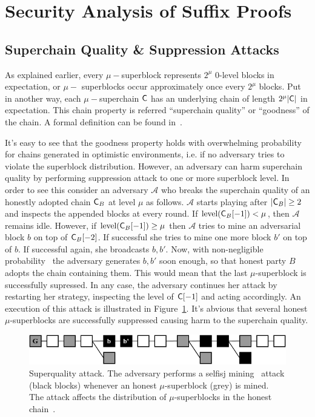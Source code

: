 \section{Security Analysis of Suffix Proofs}

\subsection{Superchain Quality \& Suppression Attacks}

As explained earlier, every $\mu-$superblock represents $2^\mu$ 0-level blocks in expectation, or $\mu-$ superblocks occur approximately once every $2^\mu$ blocks. Put in another way, each $\mu-$superchain $\mathsf{C}$ has an underlying chain of length $2^\mu \lvert \mathsf{C} \rvert$ in expectation. This chain property is referred ``superchain quality'' or ``goodness'' of the chain. A formal definition can be found in~\cite{nipopows}.

It's easy to see that the goodness property holds with overwhelming probability for chains generated in optimistic environments, i.e. if no adversary tries to violate the superblock distribution. However, an adversary can harm superchain quality by performing suppression attack to one or more superblock level. In order to see this consider an adversary $\mathcal{A}$ who breaks the superchain quality of an honestly adopted chain $\mathsf{C}_B$ at level $\mu$ as follows. $\mathcal{A}$ starts playing after $\lvert \mathsf{C}_B \rvert \geq 2$ and inspects the appended blocks at every round. If $\text{level}(\mathsf{C}_B[-1]) < \mu$, then $\mathcal{A}$ remains idle. However, if $\text{level}(\mathsf{C}_B[-1]) \geq \mu$ then $\mathcal{A}$ tries to mine an adversarial block $b$ on top of $\mathsf{C}_B[-2]$. If successful she tries to mine one more block $b'$ on top of $b$. If successful again, she broadcasts $b, b'$. Now, with non-negligible probability~\cite{nipopows} the adversary generates $b, b'$ soon enough, so that honest party $B$ adopts the chain containing them. This would mean that the last $\mu$-superblock is successfully supressed. In any case, the adversary continues her attack by restarting her strategy, inspecting the level of $\mathsf{C}[-1]$ and acting accordingly. An execution of this attack is illustrated in Figure~\ref{fig:superquality_attack}. It's abvious that several honest $\mu$-superblocks are successfully suppressed causing harm to the superchain quality. 

\begin{figure}[h!]
	\begin{center}
		\includegraphics[width=0.7\columnwidth]{figures/superquality_attack.pdf}
	\end{center}
	\caption{Superquality attack. The adversary performs a selfisj mining~\cite{selfish} attack (black blocks) whenever an honest $\mu$-superblock (grey) is mined. The attack affects the distribution of $\mu$-superblocks in the honest chain~\cite{nipopows}.}
	\label{fig:superquality_attack}
\end{figure}

